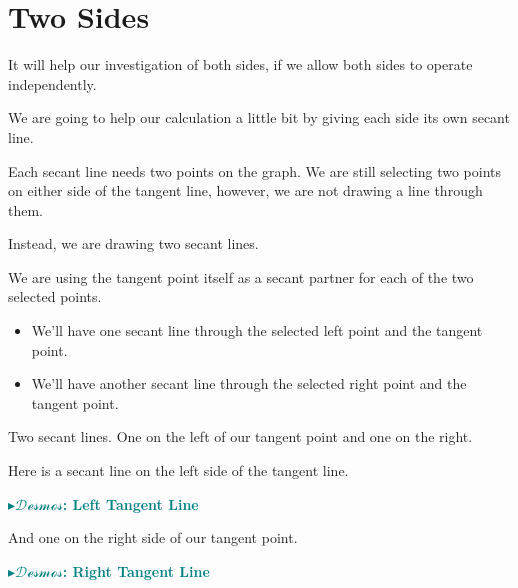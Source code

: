 \documentclass{ximera}
\begin{document}
\section*{Two Sides}


It will help our investigation of both sides, if we allow both sides to operate independently. 


We are going to help our calculation a little bit by giving each side its own secant line.  



Each secant line needs two points on the graph. We are still selecting two points on either side of the tangent line, however, we are not drawing a line through them.

Instead, we are drawing two secant lines.

We are using the tangent point itself as a secant partner for each of the two selected points.


\begin{itemize}
\item We'll have one secant line through the selected left point and the tangent point.
\item We'll have another secant line through the selected right point and the tangent point.
\end{itemize}

Two secant lines. One on the left of our tangent point and one on the right.



Here is a secant line on the left side of the tangent line.




\begin{onlineOnly}
\textbf{\textcolor{teal}{$\blacktriangleright \mathcal{Desmos}$: Left Tangent Line}} 
\begin{center}
\end{center}
\end{onlineOnly}







And one on the right side of our tangent point.



\begin{onlineOnly}
\textbf{\textcolor{teal}{$\blacktriangleright \mathcal{Desmos}$: Right Tangent Line}} 
\begin{center}
\end{center}
\end{onlineOnly}
\end{document}
